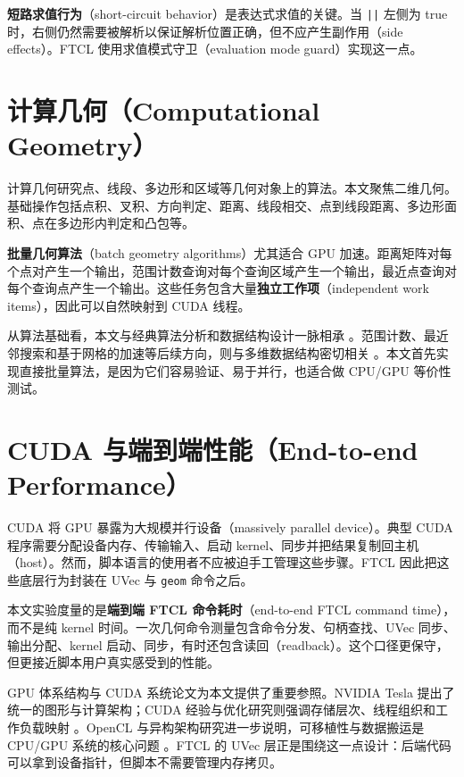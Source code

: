 \textbf{短路求值行为}（short-circuit behavior）是表达式求值的关键。当 \texttt{||} 左侧为 true 时，右侧仍然需要被解析以保证解析位置正确，但不应产生副作用（side effects）。FTCL 使用求值模式守卫（evaluation mode guard）实现这一点。

\section{计算几何（Computational Geometry）}
计算几何研究点、线段、多边形和区域等几何对象上的算法。本文聚焦二维几何。基础操作包括点积、叉积、方向判定、距离、线段相交、点到线段距离、多边形面积、点在多边形内判定和凸包等。

\textbf{批量几何算法}（batch geometry algorithms）尤其适合 GPU 加速。距离矩阵对每个点对产生一个输出，范围计数查询对每个查询区域产生一个输出，最近点查询对每个查询点产生一个输出。这些任务包含大量\textbf{独立工作项}（independent work items），因此可以自然映射到 CUDA 线程。

从算法基础看，本文与经典算法分析和数据结构设计一脉相承 \cite{cormen2022introduction,knuth1997fundamental,knuth1998sorting}。范围计数、最近邻搜索和基于网格的加速等后续方向，则与多维数据结构密切相关 \cite{samet2006foundations}。本文首先实现直接批量算法，是因为它们容易验证、易于并行，也适合做 CPU/GPU 等价性测试。

\section{CUDA 与端到端性能（End-to-end Performance）}
CUDA 将 GPU 暴露为大规模并行设备（massively parallel device）。典型 CUDA 程序需要分配设备内存、传输输入、启动 kernel、同步并把结果复制回主机（host）。然而，脚本语言的使用者不应被迫手工管理这些步骤。FTCL 因此把这些底层行为封装在 UVec 与 \texttt{geom} 命令之后。

本文实验度量的是\textbf{端到端 FTCL 命令耗时}（end-to-end FTCL command time），而不是纯 kernel 时间。一次几何命令测量包含命令分发、句柄查找、UVec 同步、输出分配、kernel 启动、同步，有时还包含读回（readback）。这个口径更保守，但更接近脚本用户真实感受到的性能。

GPU 体系结构与 CUDA 系统论文为本文提供了重要参照。NVIDIA Tesla 提出了统一的图形与计算架构；CUDA 经验与优化研究则强调存储层次、线程组织和工作负载映射 \cite{lindholm2008nvidia,garland2008parallel,ryoo2008optimization,mei2017memory}。OpenCL 与异构架构研究进一步说明，可移植性与数据搬运是 CPU/GPU 系统的核心问题 \cite{stone2010opencl,hennessy2019computer,flynn1972some}。FTCL 的 UVec 层正是围绕这一点设计：后端代码可以拿到设备指针，但脚本不需要管理内存拷贝。

